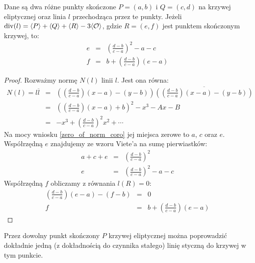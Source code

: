 \begin{theorem}
Dane są dwa różne punkty skończone $P = (a, b)$ i $Q = (c, d)$
na krzywej eliptycznej oraz linia $l$ przechodząca przez te punkty.
Jeżeli $\operatorname{div}(l) = \langle P\rangle + \langle Q\rangle + \langle R\rangle - 3\langle\mathcal{O}\rangle$,
gdzie $R = (e, f)$ jest punktem skończonym krzywej,
to:
\begin{eqnarray}
\label{chord_line_third_point_x_eqn}
e & = & \left(\frac{d-b}{c-a}\right)^2 - a - c \\
\label{chord_line_third_point_y_eqn}
f & = & b + \left(\frac{d-b}{c-a}\right)(e-a)
\end{eqnarray}
\end{theorem}

\begin{proof}
Rozważmy normę $N(l)$ linii $l$. Jest ona równa:
\begin{eqnarray*}
N(l) = l\overline{l}
& = & \left(\left(\frac{d-b}{c-a}\right)(x - a) - (y - b)\right)
      \overline{\left(\left(\frac{d-b}{c-a}\right)(x - a) - (y - b)\right)} \\
& = & \left(\left(\frac{d-b}{c-a}\right)(x-a) + b\right)^2 - x^3 - Ax - B \\
& = & -x^3 + \left(\frac{d-b}{c-a}\right)^2x^2 + \cdots
\end{eqnarray*}
Na mocy wniosku \ref{zero_of_norm_coro}
jej miejsca zerowe to $a$, $c$ oraz $e$.
Współrzędną $e$ znajdujemy ze wzoru Viete'a na sumę pierwiastków:
\begin{eqnarray*}
a + c + e & = & \left(\frac{d-b}{c-a}\right)^2 \\
        e & = & \left(\frac{d-b}{c-a}\right)^2 - a - c
\end{eqnarray*}
Współrzędną $f$ obliczamy z równania $l(R) = 0$:
\begin{eqnarray*}
\left(\frac{d-b}{c-a}\right)(e - a) - (f - b) & = & 0 \\
f & = & b + \left(\frac{d-b}{c-a}\right)(e-a)
\end{eqnarray*}
\end{proof}

\begin{theorem}\label{line_tangent_at_point_theorem}
Przez dowolny punkt skończony $P$ krzywej eliptycznej
można poprowadzić dokładnie jedną (z dokładnością do czynnika stałego)
linię styczną do krzywej w tym punkcie.
\end{theorem}

